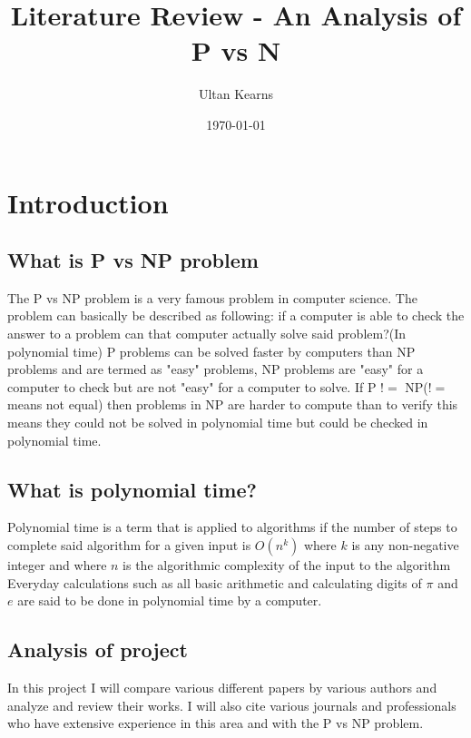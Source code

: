 \documentclass{report}
\title{Literature Review - An Analysis of P vs N}
\author{Ultan Kearns}
\date{\today}
\begin{document}
\maketitle
\tableofcontents
\chapter{Introduction}
\section{What is P vs NP problem}
The P vs NP problem is a very famous problem in computer science.  The problem
can basically be described as following: if a computer is able to check the answer
to a problem can that computer actually solve said problem?(In polynomial time)\cite{wiki}  P problems can be
solved faster by computers than NP problems and are termed as "easy" problems, NP problems
are "easy" for a computer to check but are not "easy" for a computer to solve.\cite{wiki}
If P $!=$ NP($!=$ means not equal) then problems in NP are harder to compute than to verify
this means they could not be solved in polynomial time but could be checked in polynomial time.
\section{What is polynomial time?}
Polynomial time is a term that is applied to algorithms if the number of steps
to complete said algorithm for a given input is $O(n^k)$ where $k$ is any non-negative
integer and where $n$ is the algorithmic complexity of the input to the algorithm \cite{polynomial}
Everyday calculations such as all basic arithmetic and calculating digits of $\pi$ and $e$ are said
to be done in polynomial time by a computer\cite{polynomial}.
\section{Analysis of project}
In this project I will compare various different papers by various authors and
analyze and review their works.  I will also cite various journals and professionals
who have extensive experience in this area and with the P vs NP problem.
\end{document}
